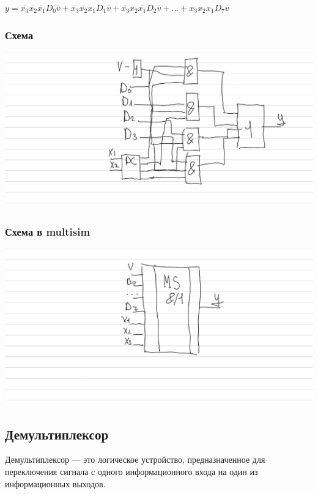 \documentclass{article}
\begin{document}
\begin{flushleft}
$y = \overline{x_3}\overline{x_2}\overline{x_1}D_0\overline{v} + \overline{x_3}\overline{x_2}x_1D_1\overline{v} + \overline{x_3}x_2\overline{x_1}D_2\overline{v} + ... + x_3x_2x_1D_7\overline{v}$

\subsubsection{Схема}

\includegraphics[width=\textwidth]{assets/multiplexer.png}

\subsubsection{Схема в multisim}

\includegraphics[width=\textwidth]{assets/multiplexer-multisim.png}

\subsection{Демультиплексор}

Демультиплексор — это логическое устройство, предназначенное для переключения сигнала с одного информационного входа на один из информационных выходов.


\end{flushleft}
\end{document}
